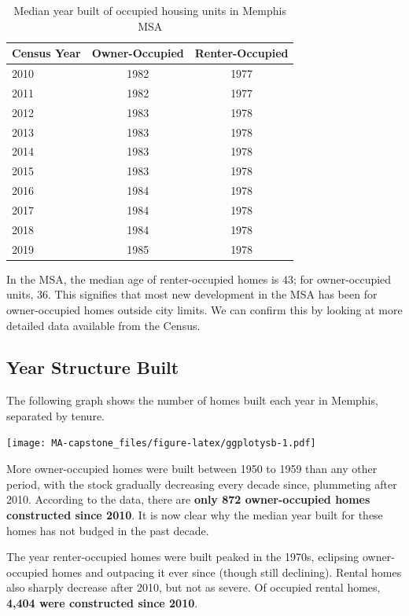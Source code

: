 \documentclass[
  openany]{book}
\begin{document}
\begin{table}

\caption{\label{tab:tblmedyrbltmsa}Median year built of occupied housing units in Memphis MSA}
\centering
\begin{tabular}[t]{l|c|c}
\hline
Census Year & Owner-Occupied & Renter-Occupied\\
\hline
2010 & 1982 & 1977\\
\hline
2011 & 1982 & 1977\\
\hline
2012 & 1983 & 1978\\
\hline
2013 & 1983 & 1978\\
\hline
2014 & 1983 & 1978\\
\hline
2015 & 1983 & 1978\\
\hline
2016 & 1984 & 1978\\
\hline
2017 & 1984 & 1978\\
\hline
2018 & 1984 & 1978\\
\hline
2019 & 1985 & 1978\\
\hline
\end{tabular}
\end{table}

In the MSA, the median age of renter-occupied homes is 43; for owner-occupied units, 36. This signifies that most new development in the MSA has been for owner-occupied homes outside city limits. We can confirm this by looking at more detailed data available from the Census.

\hypertarget{year-structure-built}{%
\subsection{Year Structure Built}\label{year-structure-built}}

The following graph shows the number of homes built each year in Memphis, separated by tenure.

\texttt{[image: MA-capstone\_files/figure-latex/ggplotysb-1.pdf]}

More owner-occupied homes were built between 1950 to 1959 than any other period, with the stock gradually decreasing every decade since, plummeting after 2010. According to the data, there are \textbf{only 872 owner-occupied homes constructed since 2010}. It is now clear why the median year built for these homes has not budged in the past decade.

The year renter-occupied homes were built peaked in the 1970s, eclipsing owner-occupied homes and outpacing it ever since (though still declining). Rental homes also sharply decrease after 2010, but not as severe. Of occupied rental homes, \textbf{4,404 were constructed since 2010}.
\end{document}
